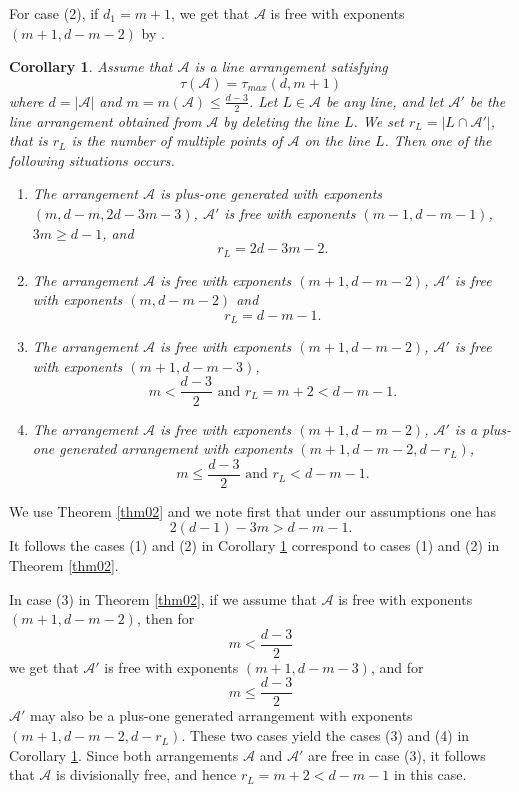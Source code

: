 \documentclass[12pt]{amsart}
\theoremstyle{plain}
\newtheorem{cor}[subsection]{Corollary}
\theoremstyle{definition}
\numberwithin{equation}{section}
\newcommand{\A}{{\mathcal A}}
\begin{document}
For case (2), if $d_1=m+1$, we get that $\A$ is free with exponents $(m+1,d-m-2)$ by \cite{Dmax,dPCTC}.


\endproof

  \begin{cor}
\label{corAe1}
Assume that $\A$ is a line arrangement satisfying
$$\tau(\A)=\tau_{max}(d,m+1)$$
where $d=|\A|$ and $m=m(\A)\leq \frac{d-3}{2}$. Let $L \in \A$ be any line, and let $\A'$ be the line arrangement obtained from $\A$ by deleting the line $L$. We set $r_L=|L \cap \A'|$, that is $r_L$ is the number of multiple points of $\A$ on the line $L$.
Then one of the following situations occurs.
\begin{enumerate} 

\item The arrangement $\A$ is plus-one generated with exponents $(m,d-m, 2d-3m-3)$, $\A'$ is free with exponents $(m-1,d-m-1)$, $3m\geq d-1$, and 
$$r_L=2d-3m-2.$$


\item The arrangement $\A$ is free with exponents $(m+1,d-m-2)$, $\A'$ is free with exponents $(m,d-m-2)$ and
$$r_L  =d-m-1.$$

\item The arrangement $\A$ is free with exponents $(m+1,d-m-2)$, $\A'$ is free with exponents $(m+1,d-m-3)$,
$$m <\frac{d-3}{2} \text{ and }   r_L=m+2 <d-m-1.$$

\item The arrangement $\A$ is free with exponents $(m+1,d-m-2)$, $\A'$ is a plus-one generated arrangement with exponents
$(m+1,d-m-2,d-r_L)$,
$$m \leq \frac{d-3}{2} \text{ and }   r_L <d-m-1.$$




\end{enumerate} 
\end{cor}
\proof
We use Theorem \ref{thm02} and we note first that under our assumptions one has
$$2(d-1)-3m >d-m-1.$$
It follows the cases (1) and (2) in Corollary \ref{corAe1} correspond to cases (1) and (2) in Theorem \ref{thm02}.

In case (3) in Theorem \ref{thm02}, if we assume that $\A$ is free with exponents $(m+1,d-m-2)$, then for
$$m<\frac{d-3}{2}$$
we get that $\A'$ is free with exponents $(m+1,d-m-3)$,
and for 
$$m \leq \frac{d-3}{2}$$
$\A'$ may also be a plus-one generated arrangement with exponents
$(m+1,d-m-2,d-r_L)$. 
These two cases yield the cases (3) and (4) in Corollary \ref{corAe1}. Since both arrangements $\A$ and $\A'$ are free in case (3), it follows that $\A$ is divisionally free, and hence $r_L=m+2<d-m-1$ in this case.
\end{document}
